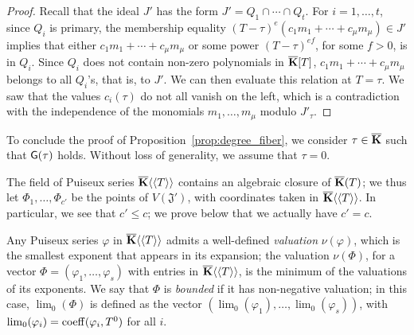 \documentclass[12pt]{article}
\begin{document}
\begin{proof}
  Recall that the ideal $J'$ has the form $J'=Q_1 \cap \cdots \cap
  Q_t$. For $i=1,\dots,t$, since $Q_i$ is primary, the membership
  equality $(T-\tau)^e (c_1 m_1 +\cdots +c_\mu m_\mu) \in J'$ implies
  that either $c_1 m_1 +\cdots +c_\mu m_\mu$ or some power
  $(T-\tau)^{ef}$, for some $f > 0$, is in $Q_i$. Since $Q_i$ does not
  contain non-zero polynomials in $\overline{\mathbf{K}}[T]$, $c_1 m_1 +\cdots+ c_\mu
  m_\mu$ belongs to all $Q_i$'s, that is, to $J'$. We can then
  evaluate this relation at $T=\tau$. We saw that the values
  $c_i(\tau)$ do not all vanish on the left, which is a contradiction
  with the independence of the monomials $m_1,\dots,m_\mu$ modulo
  $J'_\tau$.
\end{proof}



To conclude the proof of Proposition~\ref{prop:degree_fiber}, we
consider $\tau \in \overline{\mathbf{K}}$ such that ${\sf G}(\tau)$ holds. Without
loss of generality, we assume that $\tau=0$.

The field of Puiseux series $\overline{\mathbf{K}}\langle\langle T \rangle\rangle$
contains an algebraic closure of $\overline{\mathbf{K}}(T)$; we thus let
$\Phi_1,\dots,\Phi_{c'}$ be the points of $V(\mathfrak{J}')$, with
coordinates taken in $\overline{\mathbf{K}}\langle\langle T \rangle\rangle$. In
particular, we see that $c' \le c$; we prove below that we actually
have $c'=c$.

Any Puiseux series $\varphi$ in $\overline{\mathbf{K}}\langle\langle T
\rangle\rangle$ admits a well-defined {\em valuation} $\nu(\varphi)$,
which is the smallest exponent that appears in its expansion; the
valuation $\nu(\Phi)$, for a vector $\Phi=(\varphi_1,\dots,\varphi_s)$
with entries in $\overline{\mathbf{K}}\langle\langle T \rangle\rangle$, is the
minimum of the valuations of its exponents. We say that $\Phi$ is {\em
  bounded} if it has non-negative valuation; in this case,
$\lim_0(\Phi)$ is defined as the vector
$(\lim_0(\varphi_1),\dots,\lim_0(\varphi_s))$, with
$\lim_0(\varphi_i)={\rm coeff}(\varphi_i,T^0)$ for all $i$.
\end{document}
